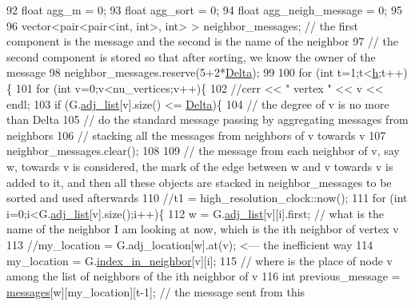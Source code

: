 \begin{DoxyCode}
92   \textcolor{keywordtype}{float} agg\_m = 0;
93   \textcolor{keywordtype}{float} agg\_sort = 0;
94   \textcolor{keywordtype}{float} agg\_neigh\_message = 0;
95 
96   vector<pair<pair<int, int>, \textcolor{keywordtype}{int}> > neighbor\_messages; \textcolor{comment}{// the first component is the message and the
       second is the name of the neighbor}
97   \textcolor{comment}{// the second component is stored so that after sorting, we know the owner of the message}
98   neighbor\_messages.reserve(5+2*\hyperlink{classgraph__message_a45dfd061b7bc73572e5132fbf66efd55}{Delta});
99 
100   \textcolor{keywordflow}{for} (\textcolor{keywordtype}{int} t=1;t<\hyperlink{classgraph__message_a934d63ed7275c211e13c6fb68824ed46}{h};t++)\{
101     \textcolor{keywordflow}{for} (\textcolor{keywordtype}{int} v=0;v<nu\_vertices;v++)\{
102       \textcolor{comment}{//cerr << " vertex " << v << endl;}
103       \textcolor{keywordflow}{if} (G.\hyperlink{classmarked__graph_a1a0bf7ca413a278763f7c878b3b6fd6f}{adj\_list}[v].size() <= \hyperlink{classgraph__message_a45dfd061b7bc73572e5132fbf66efd55}{Delta})\{
104         \textcolor{comment}{// the degree of v is no more than Delta}
105         \textcolor{comment}{// do the standard message passing by aggregating messages from neighbors}
106         \textcolor{comment}{// stacking all the messages from neighbors of v towards v}
107         neighbor\_messages.clear();
108 
109         \textcolor{comment}{// the message from each neighbor of v, say w,  towards v is considered, the mark of the edge
       between w and v towards v is added to it, and then all these objects are stacked in neighbor\_messages to be
       sorted and used afterwards}
110         \textcolor{comment}{//t1 = high\_resolution\_clock::now();}
111         \textcolor{keywordflow}{for} (\textcolor{keywordtype}{int} i=0;i<G.\hyperlink{classmarked__graph_a1a0bf7ca413a278763f7c878b3b6fd6f}{adj\_list}[v].size();i++)\{
112           w = G.\hyperlink{classmarked__graph_a1a0bf7ca413a278763f7c878b3b6fd6f}{adj\_list}[v][i].first; \textcolor{comment}{// what is the name of the neighbor I am looking at now,
       which is the ith neighbor of vertex v }
113           \textcolor{comment}{//my\_location = G.adj\_location[w].at(v); <--- the inefficient way}
114           my\_location = G.\hyperlink{classmarked__graph_aee10b537408de42476609c1e45c075d0}{index\_in\_neighbor}[v][i];
115           \textcolor{comment}{// where is the place of node v among the list of neighbors of the ith neighbor of v}
116           \textcolor{keywordtype}{int} previous\_message = \hyperlink{classgraph__message_aac77e098f0acf9650116a8e51fe3b4b7}{messages}[w][my\_location][t-1]; \textcolor{comment}{// the message sent from this
}
\end{DoxyCode}
